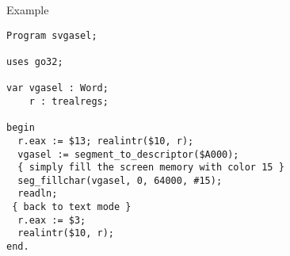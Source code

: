 \begin{FPCList}
\item[Example]
\begin{verbatim}
Program svgasel;

uses go32;

var vgasel : Word;
    r : trealregs;

begin
  r.eax := $13; realintr($10, r);
  vgasel := segment_to_descriptor($A000);
  { simply fill the screen memory with color 15 }
  seg_fillchar(vgasel, 0, 64000, #15);
  readln;
 { back to text mode }
  r.eax := $3; 
  realintr($10, r);
end.\end{verbatim}
\end{FPCList}